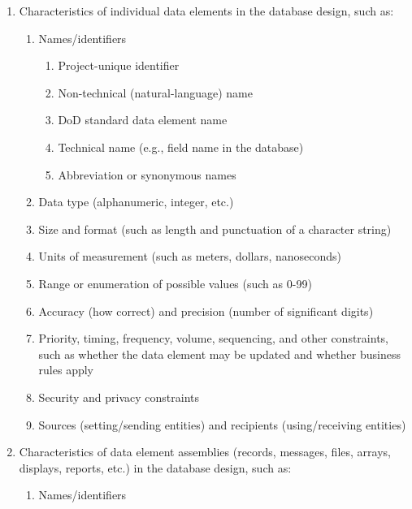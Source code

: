 \begin{enumerate}
\itemsep1pt\parskip0pt
\item
  Characteristics of individual data elements in the database design,
  such as:

  \begin{enumerate}
  \itemsep1pt\parskip0pt
  \item
    Names/identifiers

    \begin{enumerate}
    \itemsep1pt\parskip0pt
    \item
      Project-unique identifier
    \item
      Non-technical (natural-language) name
    \item
      DoD standard data element name
    \item
      Technical name (e.g., field name in the database)
    \item
      Abbreviation or synonymous names
    \end{enumerate}
  \item
    Data type (alphanumeric, integer, etc.)
  \item
    Size and format (such as length and punctuation of a character
    string)
  \item
    Units of measurement (such as meters, dollars, nanoseconds)
  \item
    Range or enumeration of possible values (such as 0-99)
  \item
    Accuracy (how correct) and precision (number of significant digits)
  \item
    Priority, timing, frequency, volume, sequencing, and other
    constraints, such as whether the data element may be updated and
    whether business rules apply
  \item
    Security and privacy constraints
  \item
    Sources (setting/sending entities) and recipients (using/receiving
    entities)
  \end{enumerate}
\item
  Characteristics of data element assemblies (records, messages, files,
  arrays, displays, reports, etc.) in the database design, such as:

  \begin{enumerate}
  \itemsep1pt\parskip0pt
  \item
    Names/identifiers


\end{enumerate}
\end{enumerate}
